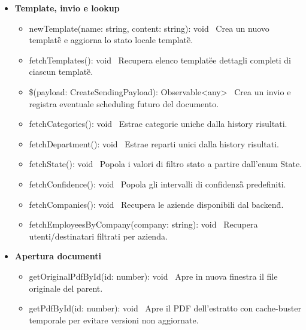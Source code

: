 \documentclass[a4paper,11pt]{article}
\begin{document}
\begin{itemize}[noitemsep, topsep=0pt]
\item \textbf{Template, invio e lookup}
\begin{itemize}[noitemsep, topsep=0pt]
\item newTemplate(name: string, content: string): void \
Crea un nuovo template\G{} e aggiorna lo stato locale template\G{}.
\item fetchTemplates(): void \
Recupera elenco template\G{}e dettagli completi di ciascun template\G{}.
\item \$(payload: CreateSendingPayload): Observable<any> \
Crea un invio e registra eventuale scheduling futuro del documento.
\item fetchCategories(): void \
Estrae categorie uniche dalla history risultati.
\item fetchDepartment(): void \
Estrae reparti unici dalla history risultati.
\item fetchState(): void \
Popola i valori di filtro stato a partire dall'enum State.
\item fetchConfidence(): void \
Popola gli intervalli di confidenza\G{} predefiniti.
\item fetchCompanies(): void \
Recupera le aziende disponibili dal backend\G{}.
\item fetchEmployeesByCompany(company: string): void \
Recupera utenti/destinatari filtrati per azienda.
\end{itemize}

\item \textbf{Apertura documenti}
\begin{itemize}[noitemsep, topsep=0pt]
\item getOriginalPdfById(id: number): void \
Apre in nuova finestra il file originale del parent.
\item getPdfById(id: number): void \
Apre il PDF dell'estratto con cache-buster temporale per evitare versioni non aggiornate.
\end{itemize}
\end{itemize}
\end{document}
